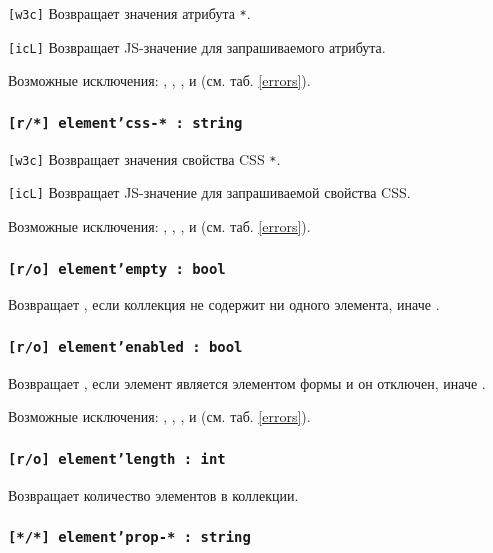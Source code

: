 \texttt{[w3c]} Возвращает значения атрибута \texttt{*}.

\texttt{[icL]} Возвращает JS-значение для запрашиваемого атрибута.

Возможные исключения: , , ,  и  (см. таб. \ref{errors}).

\subsubsection{\texttt{[r/*] element'css-* : string}}

\texttt{[w3c]} Возвращает значения свойства CSS \texttt{*}.

\texttt{[icL]} Возвращает JS-значение для запрашиваемой свойства CSS.

Возможные исключения: , , ,  и  (см. таб. \ref{errors}).

\subsubsection{\texttt{[r/o] element'empty : bool}}

Возвращает \true, если коллекция не содержит ни одного элемента, иначе \false.

\subsubsection{\texttt{[r/o] element'enabled : bool}}

Возвращает \false, если элемент является элементом формы и он отключен, иначе \true. 

Возможные исключения: , , ,  и  (см. таб. \ref{errors}).

\subsubsection{\texttt{[r/o] element'length : int}}

Возвращает количество элементов в коллекции.

\subsubsection{\texttt{[*/*] element'prop-* : string}}

